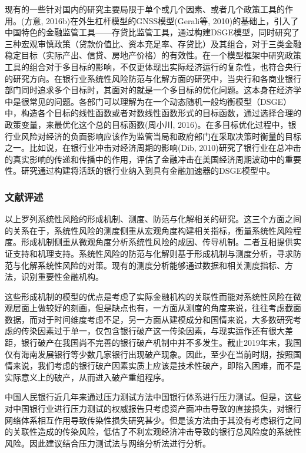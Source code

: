 现有的一些针对国内的研究主要局限于单个或几个因素、或者几个政策工具的作用。(方意, 2016b)在外生杠杆模型的GNSS模型(Gerali等, 2010)的基础上，引入了中国特色的金融监管工具——存贷比监管工具，通过构建DSGE模型，同时研究了三种宏观审慎政策（贷款价值比、资本充足率、存贷比）及其组合，对于三类金融稳定目标（实际产出、信贷、房地产价格）的有效性。在一个模型框架中研究政策工具的组合对于多目标的影响，不仅更体现出实际经济运行的复杂性，也符合央行的研究方向。在银行业系统性风险防范与化解方面的研究中，当央行和各商业银行部门同时追求多个目标时，其面对的就是一个多目标的优化问题。这本身在经济学中是很常见的问题。各部门可以理解为在一个动态随机一般均衡模型（DSGE）中，构造各个目标的线性函数或者对数线性函数形式的目标函数，通过选择合理的政策变量，来最优化这个总的目标函数(周小川, 2016)。在多目标优化过程中，银行业风险对经济的负面影响应该作为监管当局和政府部门在采取决策时衡量的目标之一。比如说，在银行业冲击对经济周期的影响(Dib, 2010)研究了银行业在总冲击的真实影响的传递和传播中的作用，评估了金融冲击在美国经济周期波动中的重要性。研究通过构建将活跃的银行业纳入到具有金融加速器的DSGE模型中。

\subsubsection{文献评述}

以上罗列系统性风险的形成机制、测度、防范与化解相关的研究。这三个方面之间的关系在于，系统性风险的测度侧重从宏观角度构建相关指标，衡量系统性风险程度。形成机制侧重从微观角度分析系统性风险的成因、传导机制。二者互相提供实证支持和机理支持。系统性风险的防范与化解则基于形成机制与测度分析，寻求防范与化解系统性风险的对策。现有的测度分析能够通过数据和相关测度指标、方法，识别重要性金融机构。

这些形成机制的模型的优点是考虑了实际金融机构的关联性而能对系统性风险在微观层面上做较好的刻画，但是缺点也有，一方面从测度的角度来说，往往考虑截面数据，而对于时间维度考虑不足，另一方面从建模成分和国情来说，大多数研究考虑的传染因素过于单一，仅包含银行破产这一传染因素，与现实运作还有很大差距，银行破产在我国尚不完善的银行破产机制中并不多发生。截止2019年末，我国仅有海南发展银行等少数几家银行出现破产现象。因此，至少在当前时期，按照国情来说，我们考虑的银行破产因素实质上应该是技术性破产，即陷入困难，而不是实际意义上的破产，从而进入破产重组程序。

中国人民银行近几年来通过压力测试方法中国银行体系进行压力测试。但是，这些对中国银行业进行压力测试的权威报告只考虑资产面冲击导致的直接损失，对银行网络体系相互作用导致传染性损失研究甚少。但是该方法由于其没有考虑银行之间的关联性造成的传染风险，低估了不利宏观经济冲击导致的银行总风险度的系统性风险。因此建议结合压力测试法与网络分析法进行分析。

